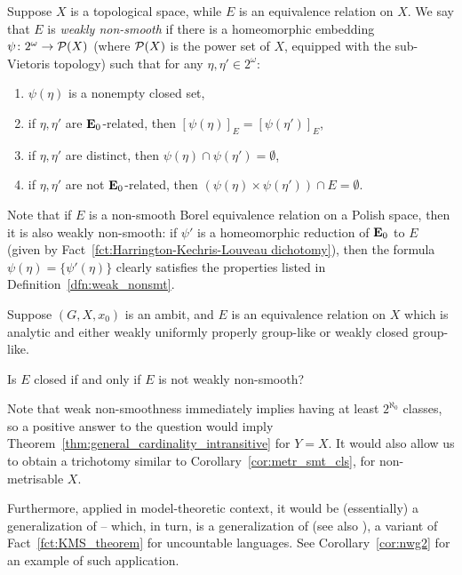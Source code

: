 	\begin{dfn}
		\label{dfn:weak_nonsmt}
		Suppose $X$ is a topological space, while $E$ is an equivalence relation on $X$. We say that $E$ is \emph{weakly non-smooth} if there is a homeomorphic embedding $\psi\colon 2^{\omega}\to {\mathcal P}(X)$ (where ${\mathcal P}(X)$ is the power set of $X$, equipped with the sub-Vietoris topology) such that for any $\eta,\eta'\in 2^{\omega}$:
		\begin{enumerate}
			\item
			$\psi(\eta)$ is a nonempty closed set,
			\item
			if $\eta,\eta'$ are $\mathrel{ { {\mathbf E}_0 } }$-related, then $[\psi(\eta)]_{E}=[\psi(\eta')]_{E}$,
			\item
			if $\eta,\eta'$ are distinct, then $\psi(\eta)\cap\psi(\eta')=\emptyset$,
			\item
			if $\eta,\eta'$ are not $\mathrel{ { {\mathbf E}_0 } }$-related, then $(\psi(\eta)\times \psi(\eta'))\cap E=\emptyset$.\xqed{\lozenge}
		\end{enumerate}
	\end{dfn}
	
	\begin{rem}
		Note that if $E$ is a non-smooth Borel equivalence relation on a Polish space, then it is also weakly non-smooth: if $\psi'$ is a homeomorphic reduction of $\mathrel{ { {\mathbf E}_0 } }$ to $E$ (given by Fact~\ref{fct:Harrington-Kechris-Louveau dichotomy}), then the formula $\psi(\eta)=\{\psi'(\eta)\}$ clearly satisfies the properties listed in Definition~\ref{dfn:weak_nonsmt}.\xqed{\lozenge}
	\end{rem}
	
	
	
	\begin{qu}
		\label{qu:broad_nonmetrisable}
		Suppose $(G, X, x_0)$ is an ambit, and $E$ is an equivalence relation on $X$ which is analytic and either weakly uniformly properly group-like or weakly closed group-like.
		
		Is $E$ closed if and only if $E$ is not weakly non-smooth?
	\end{qu}
	Note that weak non-smoothness immediately implies having at least $2^{\aleph_0}$ classes, so a positive answer to the question would imply Theorem~\ref{thm:general_cardinality_intransitive} for $Y=X$. It would also allow us to obtain a trichotomy similar to Corollary~\ref{cor:metr_smt_cls}, for non-metrisable $X$.
	
	Furthermore, applied in model-theoretic context, it would be (essentially) a generalization of \cite[Theorem 3.18]{KR16} -- which, in turn, is a generalization of \cite[Theorem 5.1]{KMS14} (see also \cite[Theorems 2.19, 3.19]{KM14}), a variant of Fact~\ref{fct:KMS_theorem} for uncountable languages. See Corollary~\ref{cor:nwg2} for an example of such application.
	
